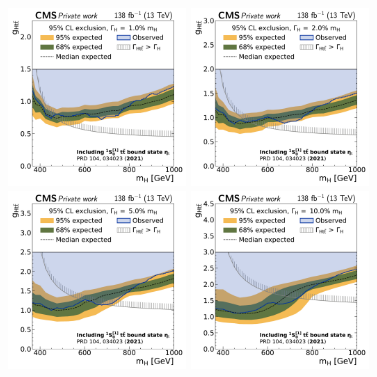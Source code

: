 \begin{figure}[!ph]
    \centering
    \includegraphics[width=0.42\textwidth]{figures/ah/limits_etat_w2p8/H_limit_w1p0_g-scan.pdf}%
    \hspace*{0.05\textwidth}%
    \includegraphics[width=0.42\textwidth]{figures/ah/limits_etat_w2p8/H_limit_w2p0_g-scan.pdf} \\
    \includegraphics[width=0.42\textwidth]{figures/ah/limits_etat_w2p8/H_limit_w5p0_g-scan.pdf}%
    \hspace*{0.05\textwidth}%
    \includegraphics[width=0.42\textwidth]{figures/ah/limits_etat_w2p8/H_limit_w10p0_g-scan.pdf}

\end{figure}
